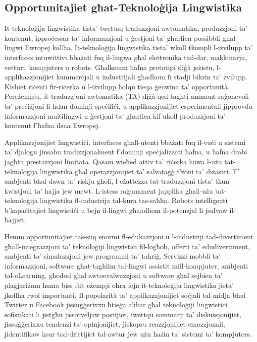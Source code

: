 \documentclass[]{../../metanetpaper}
\begin{document}
\begin{multicols}{2}
\subsection{Opportunitajiet għat-Teknoloġija Lingwistika}

It-teknoloġija lingwistika tista’ twettaq traduzzjoni awtomatika, produzzjoni ta’ kontenut, ipproċessar ta’ informazzjoni u ġestjoni ta’ għarfien possibbli għal-lingwi Ewropej kollha. It-teknoloġija lingwistika tista’ wkoll tkompli l-iżvilupp ta’ interfaces intuwittivi bbażati fuq il-lingwa għal elettronika tad-dar, makkinarju, vetturi, kompjuters u robots. Għalkemm ħafna prototipi diġà jeżistu, l-applikazzjonijiet kummerċjali u industrijali għadhom fi stadji bikrin ta’ żvilupp. Kisbiet riċenti fir-riċerka u l-iżvilupp ħolqu tieqa ġenwina ta’ opportunità. Pereżempju, it-traduzzjoni awtomatika (TA) diġà qed tagħti ammont raġonevoli ta’ preċiżjoni fi ħdan dominji speċifiċi, u applikazzjonijiet esperimentali jipprovdu informazzjoni multilingwi u ġestjoni ta’ għarfien kif ukoll produzzjoni ta’ kontenut f’ħafna ilsna Ewropej.

Applikazzjonijiet lingwistiċi, interfaces għall-utenti bbażati fuq il-vuċi u sistemi ta’ djalogu jinsabu tradizzjonalment f’dominji speċjalizzati ħafna, u ħafna drabi jagħtu prestazzjoni limitata. Qasam wieħed attiv ta’ riċerka huwa l-użu tat-teknoloġija lingwistika għal operazzjonijiet ta’ salvataġġ f'zoni ta’ diżastri. F’ ambjenti bħal dawn ta’ riskju għoli, l-eżattezza tat-traduzzjoni tista’ tkun kwistjoni ta’ ħajja jew mewt. L-istess raġunament japplika għall-użu tat-teknoloġija lingwistika fl-industrija tal-kura tas-saħħa. Robots intelliġenti b’kapaċitajiet lingwistiċi u bejn il-lingwi għandhom il-potenzjal li jsalvaw il-ħajjiet.

Hemm opportunitajiet tas-suq enormi fl-edukazzjoni u l-industriji tad-divertiment għall-integrazzjoni ta’ teknoloġiji lingwistiċi fil-logħob, offerti ta’ edudivertiment, ambjenti ta’ simulazzjoni jew programmi ta’ taħriġ. Servizzi mobbli ta’ informazzjoni, software  għat-tagħlim tal-lingwi assistit mill-kompjuter, ambjenti tal-eLearning, għodod għal awtoevalwazzjoni u software għal sejbien ta’ plaġjariżmu huma biss ftit eżempji oħra fejn it-teknoloġija lingwistika jista’ jkollha rwol importanti. Il-popolarità ta’ applikazzjonijiet soċjali tal-midja bħal Twitter u Facebook jissuġġerixxu ħtieġa akbar għal teknoloġiji lingwistiċi sofistikati li jistgħu jissorveljaw postijiet, iwettqu sommarji ta’ diskussjonijiet, jissuġġerixxu tendenzi ta’ opinjonijiet, jiskopru reazzjonijiet emozzjonali, jidentifikaw ksur tad-drittijiet tal-awtur jew użu ħażin ta’ sistemi ta’ kompjuters.


\end{multicols}
\end{document}
